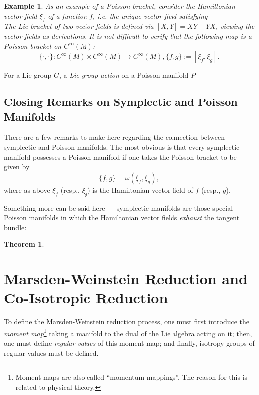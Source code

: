 \documentclass{tufte-handout}
\newtheorem{thrm}{Theorem}
\newtheorem{example}{Example}
\begin{document}
\begin{example}
As an example of a Poisson bracket, consider the \emph{Hamiltonian vector field} $\xi_f$ of a function $f$, i.e. the unique vector field satisfying
$$
$$
The Lie bracket of two vector fields is defined via $[X,Y] = XY - YX$, viewing the vector fields as derivations. It is not difficult to verify that the following map is a Poisson bracket on $C^\infty(M)$:
$$
\{\cdot, \cdot\}: C^\infty(M) \times C^\infty(M) \to C^\infty(M), \{f,g\} := [\xi_f,\xi_g].
$$
\end{example}

For a Lie group $G$, a \emph{Lie group action} on a Poisson manifold $P$ 

\subsection{Closing Remarks on Symplectic and Poisson Manifolds}
There are a few remarks to make here regarding the connection between symplectic and Poisson manifolds. The most obvious is that every symplectic manifold possesses a Poisson manifold if one takes the Poisson bracket to be given by
$$
\{f,g\} = \omega(\xi_f,\xi_g),
$$
where as above $\xi_f$ (resp., $\xi_g$) is the Hamiltonian vector field of $f$ (resp., $g$).

Something more can be said here --- symplectic manifolds are those special Poisson manifolds in which the Hamiltonian vector fields \emph{exhaust} the tangent bundle:
\begin{thrm}
\end{thrm}

\section{Marsden-Weinstein Reduction and Co-Isotropic Reduction}
To define the Marsden-Weinstein reduction process, one must first introduce the \emph{moment map}\footnote{Moment maps are also called ``momentum mappings''. The reason for this is related to physical theory.} taking a manifold to the dual of the Lie algebra acting on it; then, one must define \emph{regular values} of this moment map; and finally, isotropy groups of regular values must be defined.
\end{document}
